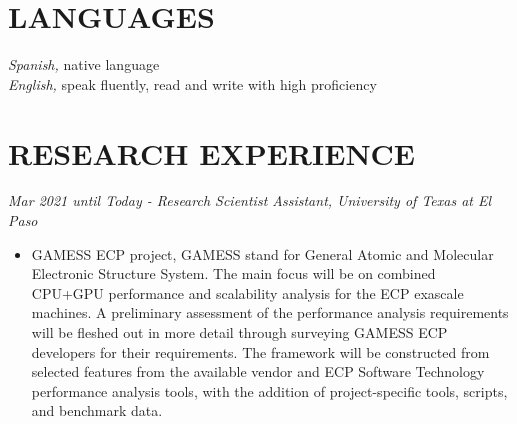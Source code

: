 \documentclass[margin]{res}
\begin{document}
\begin{resume}
\section{LANGUAGES}
{\sl Spanish,} native language\\
{\sl English,} speak fluently, read and write with high proficiency

% 

\section{RESEARCH EXPERIENCE}
{\sl Mar 2021 until Today - Research Scientist Assistant, University of Texas at El Paso} %
\begin{itemize}\itemsep -2pt
\item GAMESS ECP project, GAMESS stand for General Atomic and Molecular Electronic Structure System. 
The main focus will be on combined CPU+GPU performance and scalability analysis for the ECP exascale machines. A preliminary assessment of the performance analysis requirements will be fleshed out in more detail through surveying GAMESS ECP developers for their requirements. The framework will be constructed from selected features from the available vendor and ECP Software Technology performance analysis tools, with the addition of project-specific tools, scripts, and benchmark data.
\end{itemize}


\end{resume}
\end{document}
